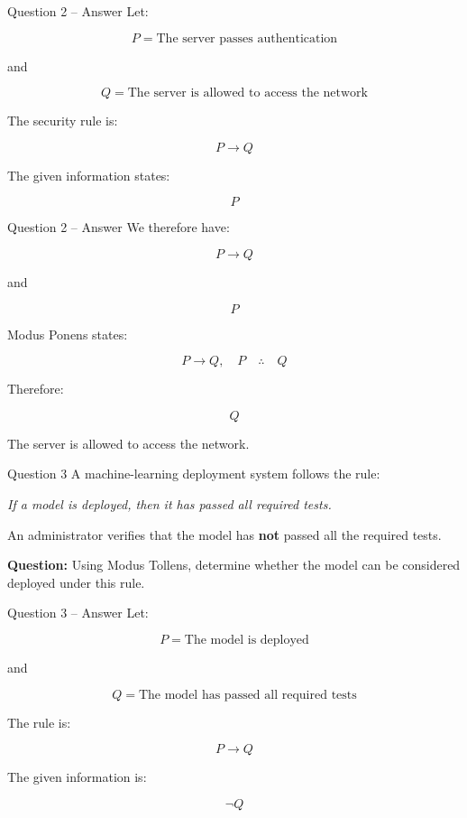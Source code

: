 \begin{frame}{Question 2 -- Answer}
Let:

$$
P=\text{The server passes authentication}
$$

and

$$
Q=\text{The server is allowed to access the network}
$$

The security rule is:

$$
P\rightarrow Q
$$

The given information states:

$$
P
$$

\end{frame}

\begin{frame}{Question 2 -- Answer}
We therefore have:

$$
P\rightarrow Q
$$

and

$$
P
$$

Modus Ponens states:

$$
P\rightarrow Q,\quad P
\quad\therefore\quad Q
$$

Therefore:

$$
\boxed{Q}
$$

The server is allowed to access the network.
\end{frame}


\begin{frame}{Question 3}
A machine-learning deployment system follows the rule:

\begin{center}
\textit{If a model is deployed, then it has passed all required tests.}
\end{center}

An administrator verifies that the model has \textbf{not} passed all the
required tests.

\textbf{Question:} Using Modus Tollens, determine whether the model can be
considered deployed under this rule.
\end{frame}

\begin{frame}{Question 3 -- Answer}
Let:

$$
P=\text{The model is deployed}
$$

and

$$
Q=\text{The model has passed all required tests}
$$

The rule is:

$$
P\rightarrow Q
$$

The given information is:

$$
\neg Q
$$

\end{frame}

